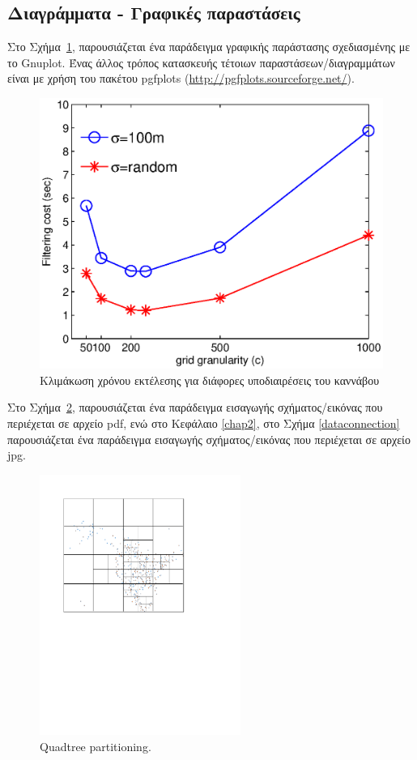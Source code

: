 \subsection{Διαγράμματα - Γραφικές παραστάσεις}
Στο Σχήμα~\ref{fig1}, παρουσιάζεται ένα παράδειγμα γραφικής παράστασης σχεδιασμένης με το Gnuplot. Ένας άλλος τρόπος κατασκευής τέτοιων παραστάσεων/διαγραμμάτων είναι με χρήση του πακέτου pgfplots (\url{http://pgfplots.sourceforge.net/}).
\begin{figure}[htb]
\includegraphics[scale=0.7]{figures/grid_granularity.eps}
\centering
\caption{Κλιμάκωση χρόνου εκτέλεσης για διάφορες υποδιαιρέσεις του καννάβου}	
\label{fig1}
\end{figure} 

Στο Σχήμα~\ref{Quadtree}, παρουσιάζεται ένα παράδειγμα εισαγωγής σχήματος/εικόνας που περιέχεται σε αρχείο pdf, ενώ στο Κεφάλαιο \ref{chap2}, στο Σχήμα \ref{dataconnection} παρουσιάζεται ένα παράδειγμα εισαγωγής σχήματος/εικόνας που περιέχεται σε αρχείο jpg.
\begin{figure}[htb]
\centering
\includegraphics[width = 0.57\columnwidth, height = 8.5cm ]{figures/quadtree.pdf}
\caption{Quadtree partitioning.}
\label{Quadtree}
\end{figure}

